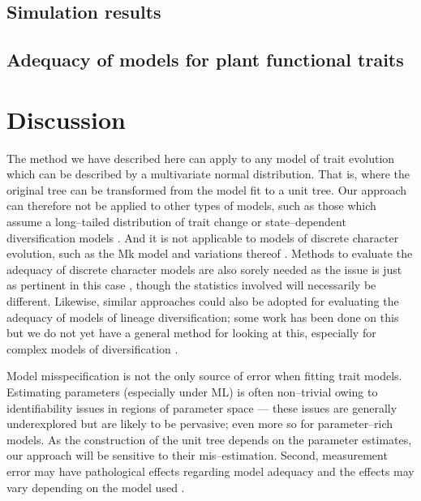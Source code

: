 \documentclass[a4paper,12pt]{article}
\begin{document}
\subsection*{Simulation results}

\subsection*{Adequacy of models for plant functional traits}

\section*{Discussion}

The method we have described here can apply to any model of trait evolution which can be described by a multivariate normal distribution. That is, where the original tree can be transformed from the model fit to a unit tree. Our approach can therefore not be applied to other types of models, such as those which assume a long--tailed distribution of trait change \citep[e.g.][]{Landis2012} or state--dependent diversification models \citep[e.g.][]{Bokma2008, Bokma2010, FitzJohn2010}. And it is not applicable to models of discrete character evolution, such as the Mk model \citep{Pagel1994, Lewis2001} and variations thereof \citep[e.g.][]{Maddison2007, WagnerMarcot2010, Mazeralli2012, Beaulieu2013} \citep[but see Felsenstein's threshold model;][]{Felsenstein2005, Felsenstein2012}. Methods to evaluate the adequacy of discrete character models are also sorely needed as the issue is just as pertinent in this case \citep{ReadNee1995}, though the statistics involved will necessarily be different. Likewise, similar approaches could also be adopted for evaluating the adequacy of models of lineage diversification; some work has been done on this \citep[e.g.][]{Rabosky2009AmNat, Rabosky2012} but we do not yet have a general method for looking at this, especially for complex models of diversification \citep[e.g.][]{Stadler2011, Etienne2012}.

Model misspecification is not the only source of error when fitting trait models. Estimating parameters (especially under ML) is often non--trivial owing to identifiability issues in regions of parameter space \citep{Ane2008, HoAne2012} --- these issues are generally underexplored but are likely to be pervasive; even more so for parameter--rich models. As the construction of the unit tree depends on the parameter estimates, our approach will be sensitive to their mis--estimation. Second, measurement error may have pathological effects regarding model adequacy \citep{HarmonLosos2005} and the effects may vary depending on the model used \citep{RevellReynolds2012, PennellPE}.
\end{document}
